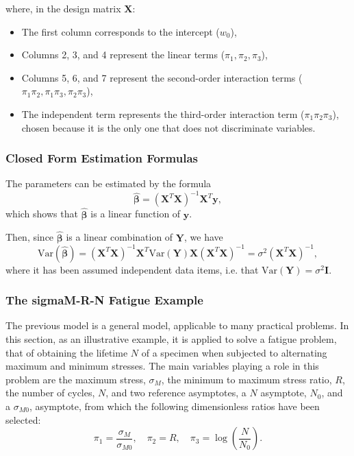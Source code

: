 \documentclass[
	11pt, %
	fleqn, %
	a4paper, %
]{LegrandOrangeBook}
\begin{document}
where, in the design matrix $\mathbf{X}$:
\begin{itemize}
\item The first column corresponds to the intercept ($w_0$),
\item Columns 2, 3, and 4 represent the linear terms ($\pi_1, \pi_2, \pi_3$),
\item Columns 5, 6, and 7 represent the second-order interaction terms ($\pi_1\pi_2, \pi_1\pi_3, \pi_2\pi_3$),
\item The independent term represents the third-order interaction term ($\pi_1\pi_2\pi_3$), chosen because it is the only one that does not discriminate variables.
\end{itemize}

\subsubsection{Closed Form Estimation Formulas}

The parameters can be estimated by the formula
\begin{equation}
\hat{\boldsymbol{\beta}} = (\mathbf{X}^T\mathbf{X})^{-1}\mathbf{X}^T\mathbf{y},
\label{eq:olsestimator}
\end{equation}
which shows that $\hat{\boldsymbol{\beta}}$ is a linear function of $\mathbf{y}$.

Then, since $\hat{\boldsymbol{\beta}}$ is a linear combination of $\mathbf{Y}$, we have
\begin{equation}
\text{Var}(\hat{\boldsymbol{\beta}}) = (\mathbf{X}^T\mathbf{X})^{-1}\mathbf{X}^T\text{Var}(\mathbf{Y})\mathbf{X}(\mathbf{X}^T\mathbf{X})^{-1} = \sigma^2(\mathbf{X}^T\mathbf{X})^{-1},
\label{eq:varianceestimator}
\end{equation}
where it has been assumed independent data items, i.e. that $\text{Var}(\mathbf{Y}) = \sigma^2\mathbf{I}$.
\subsubsection{The sigmaM-R-N Fatigue Example}
The previous model is a general model, applicable to many practical problems. In this section, as an illustrative example, it is applied to solve a fatigue problem, that of obtaining the lifetime $N$ of a specimen when subjected to alternating maximum and minimum stresses. The main variables playing a role in this problem are the maximum stress, $\sigma_M$, the minimum to maximum stress ratio, $R$, the number of cycles, $N$, and two reference asymptotes, a $N$ asymptote, $N_0$, and a $\sigma_{M0}$, asymptote, from which the following dimensionless ratios have been selected:
\begin{equation}
\pi_1 = \frac{\sigma_M}{\sigma_{M0}}, \quad \pi_2 = R, \quad \pi_3 = \log\left(\frac{N}{N_0}\right).
\label{eq:fatigueratios}
\end{equation}
\end{document}
